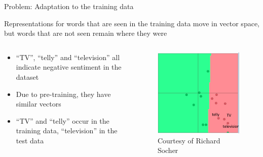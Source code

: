 \documentclass[12pt]{beamer}
\begin{document}
\begin{frame}{Problem: Adaptation to the training data}
	
Representations for words that are seen in the training data move in vector space, but words that are not seen remain where they were

\begin{columns}
	
	\begin{column}{6cm}
		\begin{small}

		\begin{itemize}
			\item “TV”, “telly” and “television” all indicate negative 	sentiment in the dataset
			\item Due to pre-training, they have similar vectors
			\item “TV” and “telly” occur in the training data,	“television” in the test data
		\end{itemize}
		\end{small}
		
	\end{column}
	\begin{column}{5cm}
		\begin{figure}
			\includegraphics[width=0.8\linewidth]{img/socher1.png}
			\caption{Courtesy of Richard Socher}
		\end{figure}	
		
	\end{column}
	
\end{columns}

\end{frame}
\end{document}
